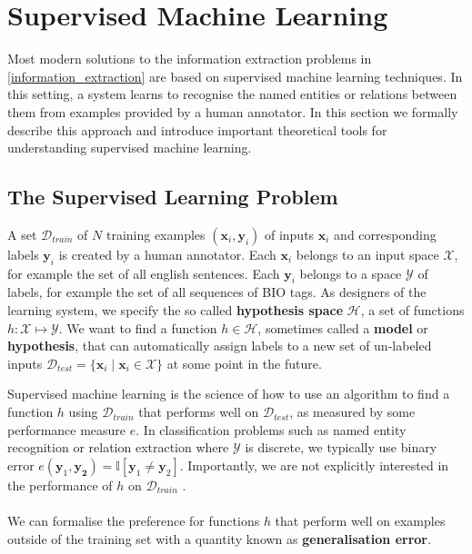 \section{Supervised Machine Learning}
\label{supervised_machine_learning}

Most modern solutions to the information extraction problems in \ref{information_extraction} are based on supervised machine learning techniques. In this setting, a system learns to recognise the named entities or relations between them from examples provided by a human annotator. In this section we formally describe this approach and introduce important theoretical tools for understanding supervised machine learning.

\subsection{The Supervised Learning Problem}
\label{the_supervised_learning_problem}
A set $\mathcal{D}_{train}$ of $N$ training examples $(\mathbf{x}_i, \mathbf{y}_i)$ of inputs $\mathbf{x}_i$ and corresponding labels $\mathbf{y}_i$ is created by a human annotator. Each $\mathbf{x}_i$ belongs to an input space $\mathcal{X}$, for example the set of all english sentences. Each $\mathbf{y}_i$ belongs to a space $\mathcal{Y}$ of labels, for example the set of all sequences of BIO tags. As designers of the learning system, we specify the so called \textbf{hypothesis space} $\mathcal{H}$, a set of functions $h: \mathcal{X} \mapsto \mathcal{Y}$. We want to find a function $h \in \mathcal{H}$, sometimes called a \textbf{model} or \textbf{hypothesis}, that can automatically assign labels to a new set of un-labeled inputs $\mathcal{D}_{test} = \{ \mathbf{x}_i \mid \mathbf{x}_i \in \mathcal{X}\}$ at some point in the future. 

Supervised machine learning is the science of how to use an algorithm to find a function $h$ using $\mathcal{D}_{train}$ that performs well on $\mathcal{D}_{test}$, as measured by some performance measure $e$. In classification problems such as named entity recognition or relation extraction where $\mathcal{Y}$ is discrete, we typically use binary error $e(\mathbf{y}_1, \mathbf{y_2}) = \mathbb{I}[\mathbf{y}_1 \neq \mathbf{y}_2]$. Importantly, we are not explicitly interested in the performance of $h$ on $\mathcal{D}_{train}$ \citep{yaser12}.
\\\\
We can formalise the preference for functions $h$ that perform well on examples outside of the training set with a quantity known as \textbf{generalisation error}.

